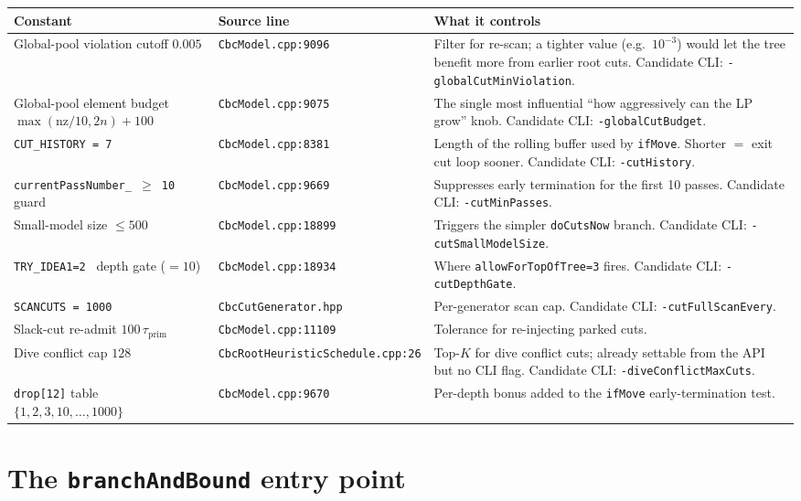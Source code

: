 \documentclass[11pt,a4paper]{article}
\begin{document}
\begin{longtable}{p{4.6cm}p{2.6cm}p{7.4cm}}
\toprule
\textbf{Constant} & \textbf{Source line} & \textbf{What it controls}\\
\midrule
\endhead
Global-pool violation cutoff $0.005$ & \texttt{CbcModel.cpp:9096} & Filter for re-scan; a tighter value (e.g.\ $10^{-3}$) would let the tree benefit more from earlier root cuts. Candidate CLI: \texttt{-globalCutMinViolation}.\\
Global-pool element budget $\max(\text{nz}/10, 2n){+}100$ & \texttt{CbcModel.cpp:9075} & The single most influential ``how aggressively can the LP grow'' knob. Candidate CLI: \texttt{-globalCutBudget}.\\
\texttt{CUT\_HISTORY = 7}            & \texttt{CbcModel.cpp:8381}  & Length of the rolling buffer used by \texttt{ifMove}. Shorter $=$ exit cut loop sooner. Candidate CLI: \texttt{-cutHistory}.\\
\texttt{currentPassNumber\_ \(\ge\) 10} guard & \texttt{CbcModel.cpp:9669} & Suppresses early termination for the first 10 passes. Candidate CLI: \texttt{-cutMinPasses}.\\
Small-model size $\le 500$           & \texttt{CbcModel.cpp:18899}  & Triggers the simpler \texttt{doCutsNow} branch. Candidate CLI: \texttt{-cutSmallModelSize}.\\
\texttt{TRY\_IDEA1=2 } depth gate ($=10$) & \texttt{CbcModel.cpp:18934} & Where \texttt{allowForTopOfTree=3} fires. Candidate CLI: \texttt{-cutDepthGate}.\\
\texttt{SCANCUTS = 1000}             & \texttt{CbcCutGenerator.hpp} & Per-generator scan cap. Candidate CLI: \texttt{-cutFullScanEvery}.\\
Slack-cut re-admit $100\,\tau_{\text{prim}}$ & \texttt{CbcModel.cpp:11109} & Tolerance for re-injecting parked cuts.\\
Dive conflict cap $128$              & \texttt{CbcRootHeuristicSchedule.cpp:26} & Top-$K$ for dive conflict cuts; already settable from the API but no CLI flag. Candidate CLI: \texttt{-diveConflictMaxCuts}.\\
\texttt{drop[12]} table $\{1,2,3,10,\dots,1000\}$ & \texttt{CbcModel.cpp:9670} & Per-depth bonus added to the \texttt{ifMove} early-termination test.\\
\bottomrule
\end{longtable}

\section{The \texttt{branchAndBound} entry point}
\label{sec:bab}
\end{document}
